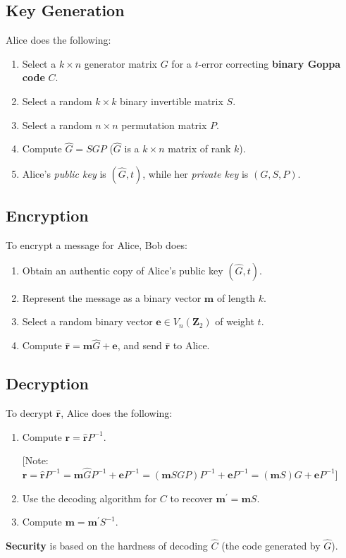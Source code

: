 \subsection*{Key Generation}
Alice does the following:
\begin{enumerate}
      \item Select a $ k\times n $ generator matrix $ G $ for a $ t $-error
            correcting \textbf{binary Goppa code} $ C $.
      \item Select a random $ k\times k $ binary invertible matrix $ S $.
      \item Select a random $ n\times n $ permutation matrix $ P $.
      \item Compute $ \hat{G}=SGP $ ($ \hat{G} $ is a $ k\times n $ matrix of rank $ k $).
      \item Alice's \emph{public key} is $ (\hat{G},t) $, while her \emph{private key}
            is $ (G,S,P) $.
\end{enumerate}
\subsection*{Encryption}
To encrypt a message for Alice, Bob does:
\begin{enumerate}
      \item Obtain an authentic copy of Alice's public key $ (\hat{G},t) $.
      \item Represent the message as a binary vector $ \symbf{m} $ of length $ k $.
      \item Select a random binary vector $ \symbf{e}\in V_n(\mathbf{Z}_2) $
            of weight $ t $.
      \item Compute $ \hat{\symbf{r}}=\symbf{m}\hat{G}+\symbf{e} $,
            and send $ \hat{\symbf{r}} $ to Alice.
\end{enumerate}
\subsection*{Decryption}
To decrypt $ \hat{\symbf{r}} $, Alice does the following:
\begin{enumerate}
      \item Compute $ \symbf{r}=\hat{\symbf{r}}P^{-1} $.

            [Note: $ \symbf{r}=\hat{\symbf{r}}P^{-1}=\symbf{m}\hat{G}P^{-1}+\symbf{e}P^{-1}
                  =(\symbf{m}SGP)P^{-1}+\symbf{e}P^{-1}=(\symbf{m}S)G+\symbf{e}P^{-1} $]
      \item Use the decoding algorithm for $ C $ to recover $ \symbf{m}^\prime =\symbf{m}S $.
      \item Compute $ \symbf{m}=\symbf{m}^\prime S^{-1} $.
\end{enumerate}
\textbf{Security} is based on the hardness of decoding $ \hat{C} $
(the code generated by $ \hat{G} $).

